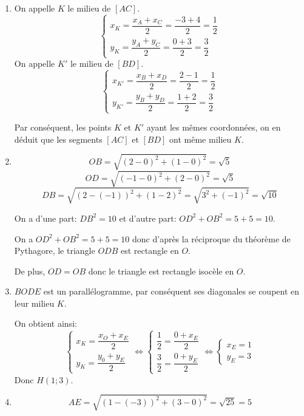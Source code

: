 \documentclass[a4paper]{article}
\begin{document}
\begin{exercice}{}{}
\begin{enumerate}
             
             \item  On appelle $K$ le milieu de $[AC]$.
        $$
        \left\{
            \begin{array}{ll}
                x_K=\dfrac{x_A+x_C}{2}=\dfrac{-3+4}{2}=\dfrac{1}{2} \\
                y_K=\dfrac{y_A+y_C}{2}=\dfrac{0+3}{2}=\dfrac{3}{2}
            \end{array}
        \right.
        $$
        On appelle $K'$ le milieu de $[BD]$.
   $$
   \left\{
       \begin{array}{ll}
           x_{K'}=\dfrac{x_B+x_D}{2}=\dfrac{2-1}{2}=\dfrac{1}{2} \\
           y_{K'}=\dfrac{y_B+y_D}{2}=\dfrac{1+2}{2}=\dfrac{3}{2}
       \end{array}
   \right.
   $$

   Par conséquent, les points $K$ et $K'$ ayant les mêmes coordonnées, on en déduit que les segments $[AC]$ et $[BD]$ ont même milieu $K$.

             
             \item 
            $$OB=\sqrt{(2-0)^2+(1-0)^2}=\sqrt{5}$$
            $$OD=\sqrt{(-1-0)^2+(2-0)^2}=\sqrt{5}$$
            $$DB=\sqrt{(2-(-1))^2+(1-2)^2}=\sqrt{3^2+(-1)^2}=\sqrt{10}$$

            On a d'une part: $DB^2=10$ et d'autre part: $OD^2+OB^2=5+5=10$.

            On a $OD^2+OB^2=5+5=10$ donc d'après la réciproque du théorème de Pythagore, le triangle $ODB$ est rectangle en $O$.
            
            De plus, $OD=OB$ donc le triangle est rectangle isocèle en $O$.


             \item $BODE$ est un parallélogramme, par conséquent ses diagonales se coupent en leur milieu $K$.

             On obtient ainsi:        
             $$
             \left\{
                 \begin{array}{ll}
                     x_K=\dfrac{x_O+x_E}{2} \\
                     y_K=\dfrac{y_0+y_E}{2}
                 \end{array}
             \right.\iff
             \left\{
                 \begin{array}{ll}
                     \dfrac{1}{2}=\dfrac{0+x_E}{2} \\
                     \dfrac{3}{2}=\dfrac{0+y_E}{2}
                 \end{array}
             \right.\iff
             \left\{
                 \begin{array}{ll}
                     x_E=1 \\
                     y_E=3
                 \end{array}
             \right.
             $$
             Donc $H\left(1;3\right)$.
     

             \item $$AE=\sqrt{(1-(-3))^2+(3-0)^2}=\sqrt{25}=5$$
         \end{enumerate}
    \end{exercice}
\end{document}
